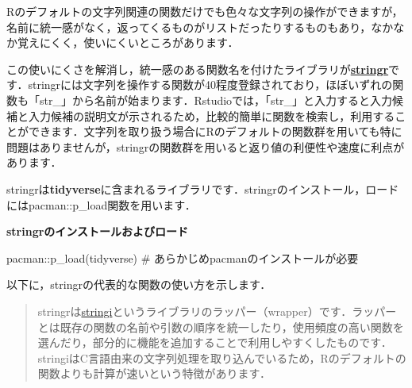\documentclass[
  letterpaper,
  DIV=11,
  numbers=noendperiod]{scrreprt}
\newenvironment{Shaded}{\begin{snugshade}}{\end{snugshade}}
\newcommand{\CommentTok}[1]{\textcolor[rgb]{0.37,0.37,0.37}{#1}}
\newcommand{\FunctionTok}[1]{\textcolor[rgb]{0.28,0.35,0.67}{#1}}
\newcommand{\NormalTok}[1]{\textcolor[rgb]{0.00,0.23,0.31}{#1}}
\newcommand{\SpecialCharTok}[1]{\textcolor[rgb]{0.37,0.37,0.37}{#1}}
\begin{document}
Rのデフォルトの文字列関連の関数だけでも色々な文字列の操作ができますが，名前に統一感がなく，返ってくるものがリストだったりするものもあり，なかなか覚えにくく，使いにくいところがあります．

この使いにくさを解消し，統一感のある関数名を付けたライブラリが\href{https://stringr.tidyverse.org/}{\textbf{stringr}}です．stringrには文字列を操作する関数が40程度登録されており，ほぼいずれの関数も「str\_」から名前が始まります．Rstudioでは，「str\_」と入力すると入力候補と入力候補の説明文が示されるため，比較的簡単に関数を検索し，利用することができます．文字列を取り扱う場合にRのデフォルトの関数群を用いても特に問題はありませんが，stringrの関数群を用いると返り値の利便性や速度に利点があります．

stringrは\textbf{tidyverse}に含まれるライブラリです．stringrのインストール，ロードにはpacman::p\_load関数を用います．

\textbf{stringrのインストールおよびロード}

\begin{Shaded}
\begin{Highlighting}[]
\NormalTok{pacman}\SpecialCharTok{::}\FunctionTok{p\_load}\NormalTok{(tidyverse) }\CommentTok{\# あらかじめpacmanのインストールが必要}
\end{Highlighting}
\end{Shaded}

以下に，stringrの代表的な関数の使い方を示します．

\begin{quote}
stringrは\href{https://stringi.gagolewski.com/}{stringi}というライブラリのラッパー（wrapper）です．ラッパーとは既存の関数の名前や引数の順序を統一したり，使用頻度の高い関数を選んだり，部分的に機能を追加することで利用しやすくしたものです．stringiはC言語由来の文字列処理を取り込んでいるため，Rのデフォルトの関数よりも計算が速いという特徴があります．
\end{quote}
\end{document}

